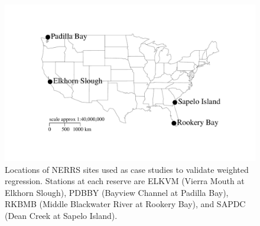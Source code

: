 \documentclass[letterpaper,12pt,oneside]{article}\usepackage[]{graphicx}\usepackage[]{color}
\makeatletter
\def\maxwidth{ %
  \ifdim\Gin@nat@width>\linewidth
    \linewidth
  \else
    \Gin@nat@width
  \fi
}
\newenvironment{knitrout}{}{} %
\makeatother
\begin{document}
\centering\vspace*{\fill}
\begin{knitrout}
\color{fgcolor}\begin{figure}[!ht]


{\centering \includegraphics[width=\maxwidth]{figure/case_map} 

}

\caption[Locations of \ac{NERRS} sites used as case studies to validate weighted regression]{Locations of \ac{NERRS} sites used as case studies to validate weighted regression.  Stations at each reserve are ELKVM (Vierra Mouth at Elkhorn Slough), PDBBY (Bayview Channel at Padilla Bay), RKBMB (Middle Blackwater River at Rookery Bay), and SAPDC (Dean Creek at Sapelo Island).\label{fig:case_map}}
\end{figure}


\end{knitrout}
\vfill
\clearpage
\end{document}
